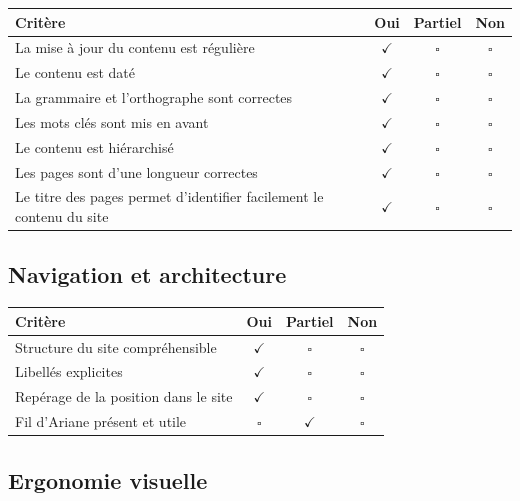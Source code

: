\documentclass[11pt,a4paper]{article}
\begin{document}
\begin{longtable}{|p{9cm}|c|c|c|}
\hline
\textbf{Critère} & \textbf{Oui} & \textbf{Partiel} & \textbf{Non} \\ \hline
\endhead
La mise à jour du contenu est régulière & $\checkmark$ & $\square$ & $\square$ \\ \hline
Le contenu est daté & $\checkmark$ & $\square$ & $\square$ \\ \hline
La grammaire et l’orthographe sont correctes & $\checkmark$ & $\square$ & $\square$ \\ \hline
Les mots clés sont mis en avant & $\checkmark$ & $\square$ & $\square$ \\ \hline
Le contenu est hiérarchisé & $\checkmark$ & $\square$ & $\square$ \\ \hline
Les pages sont d’une longueur correctes & $\checkmark$ & $\square$ & $\square$ \\ \hline
Le titre des pages permet d’identifier facilement le contenu du site & $\checkmark$ & $\square$ & $\square$ \\ \hline
\end{longtable}

\subsection*{Navigation et architecture}

\begin{longtable}{|p{9cm}|c|c|c|}
\hline
\textbf{Critère} & \textbf{Oui} & \textbf{Partiel} & \textbf{Non} \\ \hline
\endhead
Structure du site compréhensible & $\checkmark$ & $\square$ & $\square$ \\ \hline
Libellés explicites & $\checkmark$ & $\square$ & $\square$ \\ \hline
Repérage de la position dans le site & $\checkmark$ & $\square$ & $\square$ \\ \hline
Fil d'Ariane présent et utile & $\square$ & $\checkmark$ & $\square$ \\ \hline
\end{longtable}

\subsection*{Ergonomie visuelle}
\end{document}
